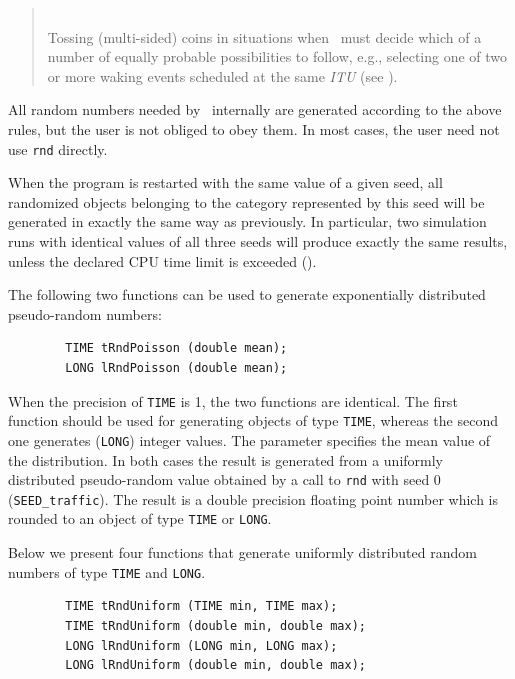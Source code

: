 \begin{quote}
\noindent{}\\ \hspace{0in}
Tossing (multi-sided) coins in situations when \smurph\ must
decide which of a number of equally probable possibilities to
follow, e.g., selecting one of two or more waking events scheduled at the
same {\em ITU\/} (see ).
\end{quote}\medskip

All random numbers needed by \smurph\ internally are generated according
to the above rules, but the user is not obliged to obey them.
In most cases, the user need not use {\tt rnd} directly.

When the program is restarted with the same value of a given seed, all
randomized objects belonging to the category represented by this seed will be
generated in exactly the same way as previously.
In particular, two
simulation runs with identical values of all three seeds will produce
exactly the same results, unless the declared CPU time limit is exceeded
().

The following two functions can be used to generate exponentially distributed
pseudo-random numbers:
\begin{verbatim}
        TIME tRndPoisson (double mean);
        LONG lRndPoisson (double mean);
\end{verbatim}

When the precision of {\tt TIME} is 1, the two functions are identical.
The first function should be used for generating objects
of type {\tt TIME},
whereas the second one generates ({\tt LONG}) integer values.
The parameter specifies the mean value of the distribution.
In both cases the result is generated from a uniformly
distributed pseudo-random
value obtained by a call to {\tt rnd} with seed 0 ({\tt SEED\_traffic}).
The result is a double precision floating point number which is rounded
to an object of type {\tt TIME} or {\tt LONG}.

Below we present four functions that generate uniformly distributed random
numbers of type {\tt TIME} and {\tt LONG}.
\begin{verbatim}
        TIME tRndUniform (TIME min, TIME max);
        TIME tRndUniform (double min, double max);
        LONG lRndUniform (LONG min, LONG max);
        LONG lRndUniform (double min, double max);
\end{verbatim}

